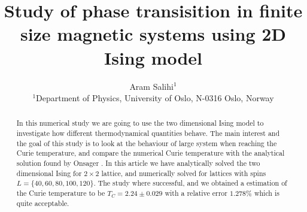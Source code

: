 \documentclass[a4paper, 10pt]{article}
\title{
Study of phase transisition in finite size magnetic systems using 2D Ising model}
\author{Aram Salihi$^1$\\
  \small $^1$Department of Physics, University of Oslo, N-0316 Oslo, Norway}
\begin{document}
\maketitle
\begin{abstract}
In this numerical study we are going to use the two dimensional Ising model to investigate
how different thermodynamical quantities behave. The main interest and the goal of this
study is to look at the behaviour of large system when reaching the Curie temperature, and compare the numerical
Curie temperature with the analytical solution found by Onsager \cite{morten}. In this article we have
analytically solved the two dimensional Ising for $2\times2$ lattice, and numerically solved for lattices with spins $L = \{40,60,80,100,120\}$.
The study where successful, and we obtained a estimation of the Curie temperature to be $T_{C} = 2.24 \pm 0.029$ with a
relative error $1.278\%$ which is quite acceptable.
\end{abstract}
\tableofcontents
\end{document}
